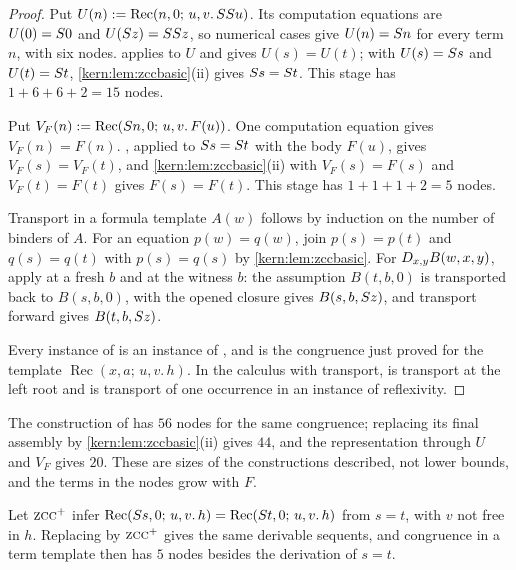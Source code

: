 \begin{proof}
Put $U(n)\mathrel{:=}\operatorname{Rec}(n,0;\,u,v.\,SS u)$.  Its computation
equations are $U(0)=S 0$ and $U(S z)=SS z$, so numerical cases
give $U(n)=S n$ for every term $n$, with six nodes.  
applies to $U$ and gives $U(s)=U(t)$; with $U(s)=S s$ and
$U(t)=S t$, \cref{kern:lem:zccbasic}(ii) gives $S s=S t$.  This
stage has $1+6+6+2=15$ nodes.

Put $V_F(n)\mathrel{:=}\operatorname{Rec}(S n,0;\,u,v.\,F(u))$.  One
computation equation gives $V_F(n)=F(n)$.  , applied to
$S s=S t$ with the body $F(u)$, gives $V_F(s)=V_F(t)$, and
\cref{kern:lem:zccbasic}(ii) with $V_F(s)=F(s)$ and $V_F(t)=F(t)$ gives
$F(s)=F(t)$.  This stage has $1+1+1+2=5$ nodes.

Transport in a formula template $A(w)$ follows by induction on the number of
binders of $A$.  For an equation $p(w)=q(w)$, join $p(s)=p(t)$ and
$q(s)=q(t)$ with $p(s)=q(s)$ by \cref{kern:lem:zccbasic}.  For
$D_{x,y}B(w,x,y)$, apply  at a fresh $b$ and  at
the witness $b$: the assumption $B(t,b,0)$ is transported back to
$B(s,b,0)$,  with the opened closure gives $B(s,b,S z)$, and
transport forward gives $B(t,b,S z)$.

Every instance of  is an instance of , and
 is the congruence just proved for the template
$\operatorname{Rec}(x,a;\,u,v.\,h)$.  In the calculus with transport,
 is transport at the left root and  is transport
of one occurrence in an instance of reflexivity.
\end{proof}

The construction of  has $56$ nodes for the same
congruence; replacing its final assembly by \cref{kern:lem:zccbasic}(ii)
gives $44$, and the representation through $U$ and $V_F$ gives $20$.  These
are sizes of the constructions described, not lower bounds, and the terms in
the nodes grow with $F$.

\begin{proposition}
\label{kern:prop:zccplus}
Let $\rulename{ZCC}^{+}$ infer
$\operatorname{Rec}(S s,0;\,u,v.\,h)=\operatorname{Rec}(S t,0;\,u,v.\,h)$
from $s=t$, with $v$ not free in $h$.  Replacing  by
$\rulename{ZCC}^{+}$ gives the same derivable sequents, and congruence in a
term template then has $5$ nodes besides the derivation of $s=t$.
\end{proposition}

